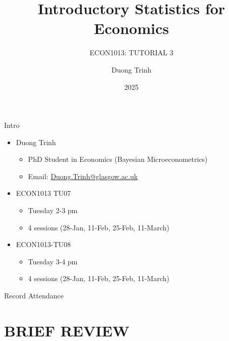 \documentclass[
  11pt,
  ignorenonframetext,
]{beamer}
\title{Introductory Statistics for Economics}
\subtitle{ECON1013: TUTORIAL 3}
\author{Duong Trinh}
\date{2025}
\institute{University of Glasgow}
\providecommand{\tightlist}{%
  \setlength{\itemsep}{0pt}\setlength{\parskip}{0pt}}
\begin{document}
\frame{\titlepage}

\begin{frame}{Intro}
\protect\hypertarget{intro}{}
\begin{itemize}
\tightlist
\item
  Duong Trinh

  \begin{itemize}
  \tightlist
  \item
    PhD Student in Economics (Bayesian Microeconometrics)
  \item
    Email: \underline{Duong.Trinh@glasgow.ac.uk}
  \end{itemize}
\end{itemize}

\vspace{3mm}

\begin{itemize}
\tightlist
\item
  ECON1013 TU07

  \begin{itemize}
  \tightlist
  \item
    Tuesday 2-3 pm
  \item
    4 sessions (28-Jan, 11-Feb, 25-Feb, 11-March)
  \end{itemize}
\item
  ECON1013-TU08

  \begin{itemize}
  \tightlist
  \item
    Tuesday 3-4 pm
  \item
    4 sessions (28-Jan, 11-Feb, 25-Feb, 11-March)
  \end{itemize}
\end{itemize}
\end{frame}

\begin{frame}{Record Attendance}
\protect\hypertarget{record-attendance}{}
\end{frame}

\hypertarget{brief-review}{%
\section{BRIEF REVIEW}\label{brief-review}}
\end{document}
